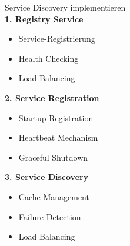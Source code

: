 \begin{KR}{Service Discovery implementieren}\\
\textbf{1. Registry Service}
\begin{itemize}
    \item Service-Registrierung
    \item Health Checking
    \item Load Balancing
\end{itemize}

\textbf{2. Service Registration}
\begin{itemize}
    \item Startup Registration
    \item Heartbeat Mechanism
    \item Graceful Shutdown
\end{itemize}

\textbf{3. Service Discovery}
\begin{itemize}
    \item Cache Management
    \item Failure Detection
    \item Load Balancing
\end{itemize}
\end{KR}

